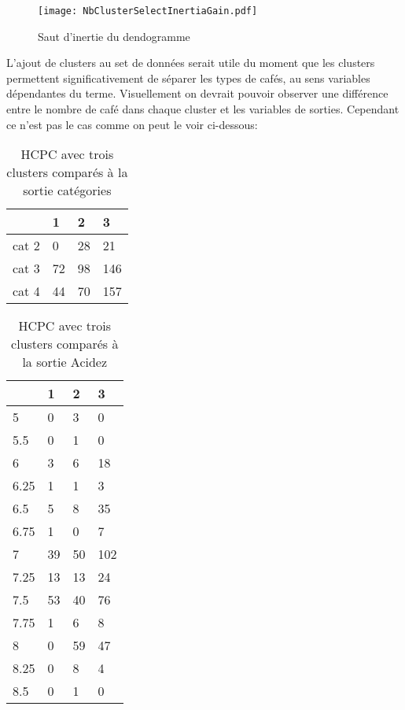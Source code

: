 
\begin{figure}[H]
	\texttt{[image: NbClusterSelectInertiaGain.pdf]}
	\caption{\label{HCT_Inert} Saut d'inertie du dendogramme  }
\end{figure}






\noindent L'ajout de clusters au set de données serait utile du moment que les clusters permettent significativement de séparer les types de cafés, au sens variables dépendantes du terme. Visuellement on devrait pouvoir observer une différence entre le nombre de café dans chaque cluster et les variables de sorties. Cependant ce n'est pas le cas comme on peut le voir ci-dessous: 


\begin{table}[H]
	\centering
	\label{cluster3category}
	\begin{tabular}{llll}
		 & 1  & 2  & 3   \\
		 \hline
		cat 2            & 0  & 28 & 21  \\
		cat 3            & 72 & 98 & 146 \\
		cat 4            & 44 & 70 & 157 
	\end{tabular}
	\caption{HCPC avec trois clusters comparés à la sortie catégories}
\end{table}



\begin{table}[H]
	\centering
	\label{cluster3acidez}
	\begin{tabular}{llll}
		& 1  & 2  & 3   \\
		\hline
		5    & 0  & 3  & 0   \\
		5.5  & 0  & 1  & 0   \\
		6    & 3  & 6  & 18  \\
		6.25 & 1  & 1  & 3   \\
		6.5  & 5  & 8  & 35  \\
		6.75 & 1  & 0  & 7   \\
		7    & 39 & 50 & 102 \\
		7.25 & 13 & 13 & 24  \\
		7.5  & 53 & 40 & 76  \\
		7.75 & 1  & 6  & 8   \\
		8    & 0  & 59 & 47  \\
		8.25 & 0  & 8  & 4   \\
		8.5  & 0  & 1  & 0  
	\end{tabular}
	\caption{HCPC avec trois clusters comparés à la sortie Acidez}
\end{table}


